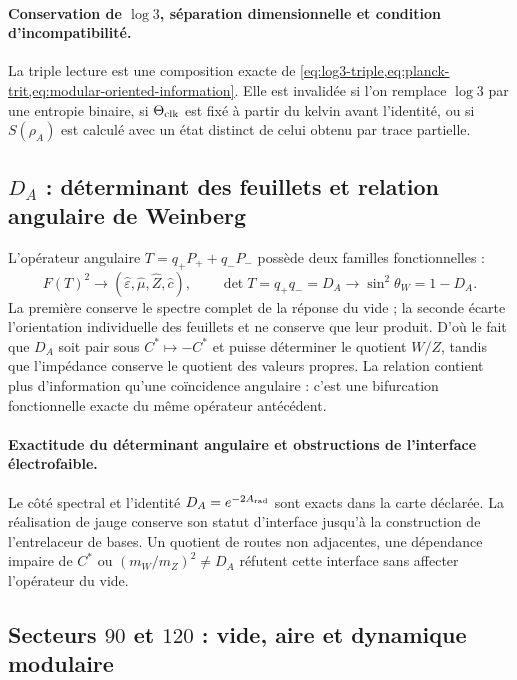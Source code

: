 \paragraph{Conservation de \(\log 3\), séparation dimensionnelle et condition d'incompatibilité.}
La triple lecture est une composition exacte de
\cref{eq:log3-triple,eq:planck-trit,eq:modular-oriented-information}. Elle est
invalidée si l'on remplace \(\log3\) par une entropie binaire, si
\(\Theta_{\rm clk}\) est fixé à partir du kelvin avant l'identité, ou si
\(S(\rho_A)\) est calculé avec un état distinct de celui obtenu par trace partielle.

\subsection{\texorpdfstring{\(D_A\)}{Déterminant angulaire} : déterminant des feuillets et relation angulaire de Weinberg}

L'opérateur angulaire \(T=q_+P_++q_-P_-\) possède deux familles fonctionnelles :
\begin{equation}
F(T)^2\longrightarrow
(\widehat\varepsilon,\widehat\mu,\widehat Z,\widehat c),
\qquad
\det T=q_+q_-=D_A\longrightarrow
\sin^2\theta_W=1-D_A.
\label{eq:atlas-DA-confluence}
\end{equation}
La première conserve le spectre complet de la réponse du vide ; la
seconde écarte l'orientation individuelle des feuillets et ne conserve que leur
produit. D'où le fait que \(D_A\) soit pair sous \(C^*\mapsto-C^*\) et puisse
déterminer le quotient \(W/Z\), tandis que l'impédance conserve le quotient
des valeurs propres. La relation contient plus d'information qu'une
coïncidence angulaire : c'est
une bifurcation fonctionnelle exacte du même opérateur antécédent.

\paragraph{Exactitude du déterminant angulaire et obstructions de l'interface électrofaible.}
Le côté spectral et l'identité \(D_A=e^{-2A_{\rm rad}}\) sont exacts dans la
carte déclarée. La réalisation de jauge conserve son statut d'interface jusqu'à
la construction de l'entrelaceur de bases. Un quotient de routes non adjacentes, une
dépendance impaire de \(C^*\) ou \((m_W/m_Z)^2\ne D_A\) réfutent cette interface sans
affecter l'opérateur du vide.

\subsection{Secteurs \(90\) et \(120\) : vide, aire et dynamique modulaire}

